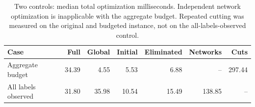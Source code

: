 \begin{table}[tb]\centering\small
\caption{Two controls: median total optimization milliseconds. Independent network optimization is inapplicable with the aggregate budget. Repeated cutting was measured on the original and budgeted instance, not on the all-labels-observed control.}
\label{tab:computation-ablations}
\setlength{\tabcolsep}{3pt}
\begin{tabular}{lrrrrrr}\toprule
Case & Full & Global & Initial & Eliminated & Networks & Cuts\\\midrule
Aggregate budget & 34.39 & 4.55 & 5.53 & 6.88 & -- & 297.44 \\
All labels observed & 31.80 & 35.98 & 10.54 & 15.49 & 138.85 & -- \\
\bottomrule\end{tabular}\end{table}
